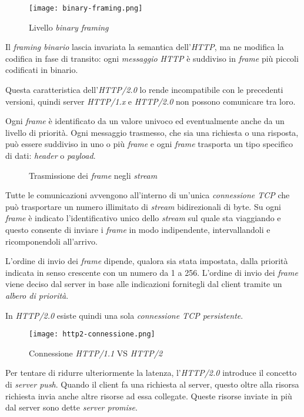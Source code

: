 \begin{figure}[h]
    \centering
    \texttt{[image: binary-framing.png]}
    \caption{Livello \emph{binary framing}}
\end{figure}\noindent
Il \emph{framing binario} lascia invariata la semantica dell'\emph{HTTP}, ma ne
modifica la codifica in fase di transito: ogni \emph{messaggio HTTP} è
suddiviso in \emph{frame} più piccoli codificati in binario.

\begin{note}
    Questa caratteristica dell'\emph{HTTP/2.0} lo rende incompatibile con le
    precedenti versioni, quindi server \emph{HTTP/1.x} e \emph{HTTP/2.0} non
    possono comunicare tra loro.
\end{note}\noindent
Ogni \emph{frame} è identificato da un valore univoco ed eventualmente anche da
un livello di priorità. Ogni messaggio trasmesso, che sia una richiesta o una
risposta, può essere suddiviso in uno o più \emph{frame} e ogni \emph{frame}
trasporta un tipo specifico di dati: \emph{header} o \emph{payload}.

\newpage
\begin{figure}[h]
    \centering
    \hfill
    \caption{Trasmissione dei \emph{frame} negli \emph{stream}}
\end{figure}

\bigskip\hspace{-0.5cm} Tutte le comunicazioni avvengono all'interno di un'unica
\emph{connessione TCP} che può trasportare un numero illimitato di \emph{stream}
bidirezionali di byte. Su ogni \emph{frame} è indicato l'identificativo unico
dello \emph{stream} sul quale sta viaggiando e questo consente di inviare i
\emph{frame} in modo indipendente, intervallandoli e ricomponendoli all'arrivo.

L'ordine di invio dei \emph{frame} dipende, qualora sia stata impostata, dalla
priorità indicata in senso crescente con un numero da 1 a 256. L'ordine di invio
dei \emph{frame} viene deciso dal server in base alle indicazioni fornitegli dal
client tramite un \emph{albero di priorità}.

\bigskip In \emph{HTTP/2.0} esiste quindi una sola \emph{connessione TCP
persistente}.

\begin{figure}[h!]
    \centering
    \texttt{[image: http2-connessione.png]}
    \caption{Connessione \emph{HTTP/1.1} VS \emph{HTTP/2}}
\end{figure}\noindent
Per tentare di ridurre ulteriormente la latenza, l'\emph{HTTP/2.0} introduce il
concetto di \emph{server push}. Quando il client fa una richiesta al server, questo
oltre alla risorsa richiesta invia anche altre risorse ad essa collegate. Queste
risorse inviate in più dal server sono dette \emph{server promise}.

